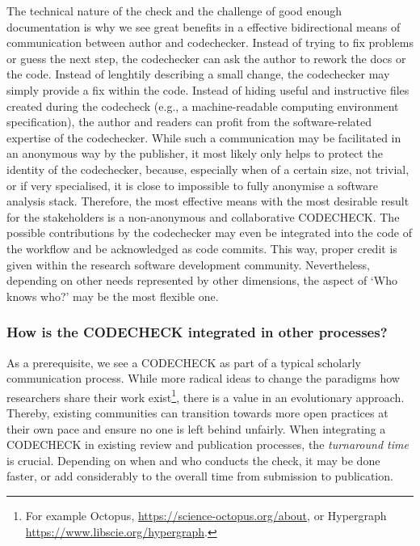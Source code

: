 \documentclass[12pt]{article}
\begin{document}
The technical nature of the check and the challenge of good enough 
documentation is why we see great benefits in a effective bidirectional
means of communication between author and codechecker. Instead of trying to
fix problems or guess the next step, the codechecker can ask the author to 
rework the docs  or the code.
Instead of lenghtily describing a small change, the codechecker may simply
provide a fix within the code.
Instead of hiding useful and  instructive files created during the codecheck
(e.g., a machine-readable computing environment specification), the author 
and readers can profit from the software-related expertise of the
codechecker.
While such a communication may be facilitated in an anonymous way by the 
publisher, it most likely only helps to protect the identity of the 
codechecker, because, especially when of a certain size, not trivial, or 
if very specialised, it is close to impossible to fully anonymise a 
software analysis stack.
Therefore, the most effective means with the most desirable result for
the stakeholders is a non-anonymous and collaborative CODECHECK.
The possible contributions by the codechecker may even be integrated into
the code of the workflow and be acknowledged as code commits. This way, 
proper credit is given within the research software development community.
Nevertheless, depending on other needs represented by other dimensions,
the aspect of `Who knows who?' may be the most flexible one.

\subsubsection*{How is the CODECHECK integrated in other processes?}\label{turnaround-time}

As a prerequisite, we see a CODECHECK as part of a typical scholarly
communication process. While more radical ideas to change the paradigms
how researchers share their work exist\footnote{For example Octopus, 
\url{https://science-octopus.org/about}, or Hypergraph
\url{https://www.libscie.org/hypergraph}.}, there is a 
value in an evolutionary approach. Thereby, existing communities can 
transition towards more open practices at their own pace and ensure
no one is left behind unfairly.
When integrating a CODECHECK in existing review and publication processes,
the \emph{turnaround time} is crucial. Depending on when and who conducts
the check, it may be done faster, or add considerably to the overall
time from submission to publication.
\end{document}
